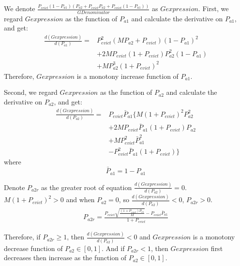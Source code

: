\begin{enumerate}
We denote $\frac{P_{evict}(1-P_{a1})(P_{a2}+P_{evict}P_{a2}+P_{evict}(1-P_{a1}))}{GDenominator}$ as $Gexpression$.
First, we regard $Gexpression$ as the function of $P_{a1}$ and calculate the derivative on $P_{a1}$, and get:
\begin{equation}
\begin{split}
\frac{d(Gexpression)}{d(P_{a1})} = &P_{evict}^{2}(MP_{a2}+P_{evict})(1-P_{a1})^2\\
&+2MP_{evict}(1+P_{evict})P_{a2}^{2}(1-P_{a1})\\
&+MP_{a2}^{3}(1+P_{evict})^2
\end{split}
\end{equation}
Therefore, $Gexpression$ is a monotony increase function of $P_{a1}$.

Second, we regard $Gexpression$ as the function of $P_{a2}$ and calculate the derivative on $P_{a2}$, and get:
\begin{equation}
\begin{split}
\frac{d(Gexpression)}{d(P_{a2})} = & P_{evict}\bar{P}_{a1}\{M(1+P_{evict})^{2}P_{a2}^2\\
&+2MP_{evict}\bar{P}_{a1}(1+P_{evict})P_{a2} \\
&+MP_{evict}^{2}\bar{P}_{a1}^2 \\
&-P_{evict}^{2}\bar{P}_{a1}(1+P_{evict})\}
\end{split}
\end{equation}
where
$$
\bar{P}_{a1} = 1 - P_{a1}
$$

Denote $P_{a2r}$ as the greater root of equation $\frac{d(Gexpression)}{d(P_{a2})}=0$.
$M(1+P_{evict})^{2} > 0$ and when $P_{a2} = 0$, so $\frac{d(Gexpression)}{d(P_{a2})} < 0$,
$P_{a2r} > 0$.
\begin{equation}
\begin{split}
P_{a2r}=\frac{P_{evict}\sqrt{\frac{(1+P_{evict})\bar{P}_{a1}}{M}}-P_{evict}\bar{P}_{a1}}{1+P_{evict}}
\end{split}
\end{equation}

Therefore, if $P_{a2r} \geq 1$, then $\frac{d(Gexpression)}{d(P_{a2})} < 0$ and $Gexpression$ is a monotony decrease function of $P_{a2} \in [0,1]$.
And if $P_{a2r} < 1$, then $Gexpression$ first decreases then increase as the function of $P_{a2} \in [0,1]$.


\end{enumerate}
